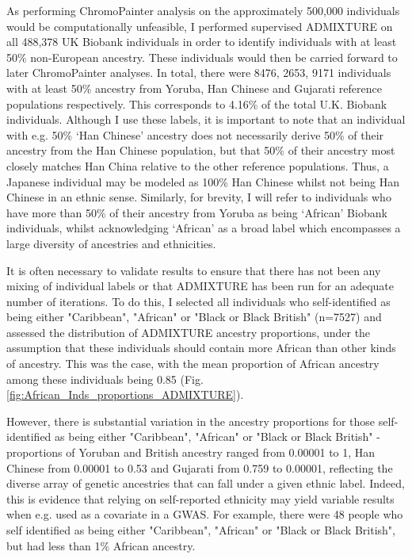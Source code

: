 As performing ChromoPainter analysis on the approximately 500,000 individuals would be computationally unfeasible, I performed supervised ADMIXTURE on all 488,378 UK Biobank individuals in order to identify individuals with at least 50\% non-European ancestry. These individuals would then be carried forward to later ChromoPainter analyses. In total, there were 8476, 2653, 9171 individuals with at least 50\% ancestry from Yoruba, Han Chinese and Gujarati reference populations respectively. This corresponds to 4.16\% of the total U.K. Biobank individuals. Although I use these labels, it is important to note that an individual with e.g. 50\% `Han Chinese' ancestry does not necessarily derive 50\% of their ancestry from the Han Chinese population, but that 50\% of their ancestry most closely matches Han China relative to the other reference populations. Thus, a Japanese individual may be modeled as 100\% Han Chinese whilst not being Han Chinese in an ethnic sense. Similarly, for brevity, I will refer to individuals who have more than 50\% of their ancestry from Yoruba as being `African' Biobank individuals, whilst acknowledging `African' as a broad label which encompasses a large diversity of ancestries and ethnicities.  

It is often necessary to validate results to ensure that there has not been any mixing of individual labels or that 	ADMIXTURE has been run for an adequate number of iterations. To do this, I selected all individuals who self-identified as being either "Caribbean", "African" or "Black or Black British" (n=7527) and assessed the distribution of ADMIXTURE ancestry proportions, under the assumption that these individuals should contain more African than other kinds of ancestry. This was the case, with the mean proportion of African ancestry among these individuals being 0.85 (Fig. \ref{fig:African_Inds_proportions_ADMIXTURE}).

However, there is substantial variation in the ancestry proportions for those self-identified as being either "Caribbean", "African" or "Black or Black British" - proportions of Yoruban and British ancestry ranged from 0.00001 to 1, Han Chinese from 0.00001 to 0.53 and Gujarati from 0.759 to 0.00001, reflecting the diverse array of genetic ancestries that can fall under a given ethnic label. Indeed, this is evidence that relying on self-reported ethnicity may yield variable results when e.g. used as a covariate in a GWAS. For example, there were 48 people who self identified as being either "Caribbean", "African" or "Black or Black British", but had less than 1\% African ancestry.

